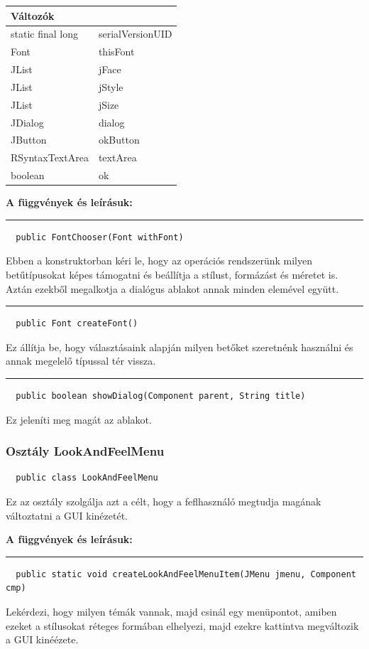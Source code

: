 \documentclass[12pt]{article}
\newcommand{\fuggveny}{\textbf{A függvények és leírásuk: \\}}
\newcommand{\vonal}{\noindent\rule{\textwidth}{1pt}}
\begin{document}
\begin{longtable}{|p{5cm}|p{10cm}|} \hline
    \multicolumn{2}{|p{15cm}|}{\textbf{Változók}}  \\ \hline
    static final long & serialVersionUID \\ \hline
  	Font & thisFont \\ \hline
  	JList & jFace \\ \hline
    JList & jStyle \\ \hline
    JList & jSize \\ \hline
  	JDialog & dialog \\ \hline
  	JButton & okButton \\ \hline
    RSyntaxTextArea & textArea \\ \hline
  	boolean & ok \\ \hline
\end{longtable}

\fuggveny
\vonal
\begin{lstlisting}
  public FontChooser(Font withFont)
\end{lstlisting}
Ebben a konstruktorban kéri le, hogy az operációs rendszerünk milyen betűtípusokat
képes támogatni és beállítja a stílust, formázást és méretet is. Aztán ezekből
megalkotja a dialógus ablakot annak minden elemével együtt.

\vonal
\begin{lstlisting}
  public Font createFont()
\end{lstlisting}
Ez állítja be, hogy választásaink alapján milyen betőket szeretnénk használni és
annak megelelő típussal tér vissza.

\vonal
\begin{lstlisting}
  public boolean showDialog(Component parent, String title)
\end{lstlisting}
Ez jeleníti meg magát az ablakot.

\subsubsection*{Osztály LookAndFeelMenu}
\begin{lstlisting}
  public class LookAndFeelMenu
\end{lstlisting}
Ez az osztály szolgálja azt a célt, hogy a feflhasználó megtudja magának változtatni
a GUI kinézetét.

\fuggveny
\vonal
\begin{lstlisting}
  public static void createLookAndFeelMenuItem(JMenu jmenu, Component cmp)
\end{lstlisting}
Lekérdezi, hogy milyen témák vannak, majd csinál egy menüpontot, amiben ezeket
a stílusokat réteges formában elhelyezi, majd ezekre kattintva megváltozik a
GUI kinéézete.
\end{document}

